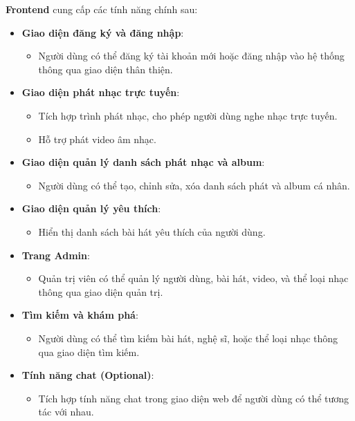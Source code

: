 \textbf{Frontend} cung cấp các tính năng chính sau:
\begin{itemize}
    \item \textbf{Giao diện đăng ký và đăng nhập}:
    \begin{itemize}
        \item Người dùng có thể đăng ký tài khoản mới hoặc đăng nhập vào hệ thống thông qua giao diện thân thiện.
    \end{itemize}
    \item \textbf{Giao diện phát nhạc trực tuyến}:
    \begin{itemize}
        \item Tích hợp trình phát nhạc, cho phép người dùng nghe nhạc trực tuyến.
        \item Hỗ trợ phát video âm nhạc.
    \end{itemize}
    \item \textbf{Giao diện quản lý danh sách phát nhạc và album}:
    \begin{itemize}
        \item Người dùng có thể tạo, chỉnh sửa, xóa danh sách phát và album cá nhân.
    \end{itemize}
    \item \textbf{Giao diện quản lý yêu thích}:
    \begin{itemize}
        \item Hiển thị danh sách bài hát yêu thích của người dùng.
    \end{itemize}
    \item \textbf{Trang Admin}:
    \begin{itemize}
        \item Quản trị viên có thể quản lý người dùng, bài hát, video, và thể loại nhạc thông qua giao diện quản trị.
    \end{itemize}
    \item \textbf{Tìm kiếm và khám phá}:
    \begin{itemize}
        \item Người dùng có thể tìm kiếm bài hát, nghệ sĩ, hoặc thể loại nhạc thông qua giao diện tìm kiếm.
    \end{itemize}
    \item \textbf{Tính năng chat (Optional)}:
    \begin{itemize}
        \item Tích hợp tính năng chat trong giao diện web để người dùng có thể tương tác với nhau.
    \end{itemize}
    \begin{figure}[h]

\end{figure}
\end{itemize}
